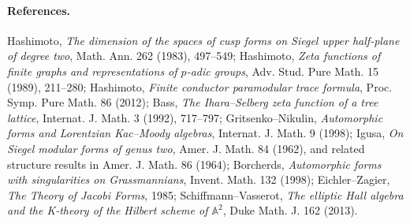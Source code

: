 \paragraph{References.}
Hashimoto, \emph{The dimension of the spaces of cusp forms on Siegel
upper half-plane of degree two}, Math. Ann. 262 (1983), 497--549;
Hashimoto, \emph{Zeta functions of finite graphs and representations
of \(p\)-adic groups}, Adv. Stud. Pure Math. 15 (1989), 211--280;
Hashimoto, \emph{Finite conductor paramodular trace formula}, Proc.
Symp. Pure Math. 86 (2012); Bass, \emph{The Ihara--Selberg zeta
function of a tree lattice}, Internat. J. Math. 3 (1992), 717--797;
Gritsenko--Nikulin, \emph{Automorphic forms and Lorentzian
Kac--Moody algebras}, Internat. J. Math. 9 (1998); Igusa,
\emph{On Siegel modular forms of genus two}, Amer. J. Math. 84
(1962), and related structure results in Amer. J. Math. 86 (1964);
Borcherds, \emph{Automorphic forms with singularities on Grassmannians},
Invent. Math. 132 (1998); Eichler--Zagier, \emph{The Theory of Jacobi
Forms}, 1985; Schiffmann--Vasserot, \emph{The elliptic Hall algebra and
the K-theory of the Hilbert scheme of \(\mathbb A^2\)}, Duke Math. J.
162 (2013).
